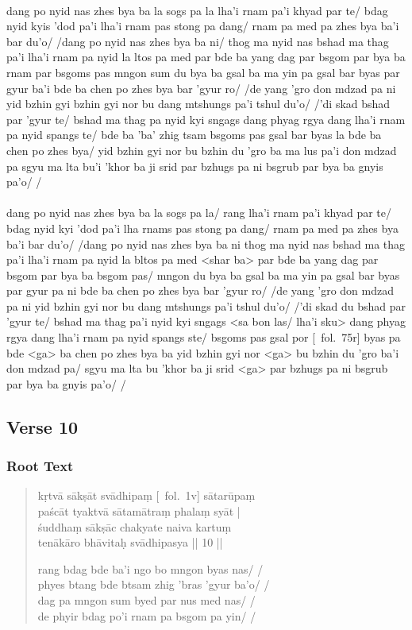 \documentclass[12pt]{article}
\begin{document}
\textbf{\TVA}\\
dang po nyid nas zhes bya ba la sogs pa la lha'i rnam pa'i khyad par te/ bdag nyid kyis 'dod pa'i lha'i rnam pas stong pa dang/ rnam pa med pa zhes bya ba'i bar du'o/ /dang po nyid nas zhes bya ba ni/ thog ma nyid nas bshad ma thag pa'i lha'i rnam pa nyid la ltos pa med par bde ba yang dag par bsgom par bya ba rnam par bsgoms pas mngon sum du bya ba gsal ba ma yin pa gsal bar byas par gyur ba'i bde ba chen po zhes bya bar 'gyur ro/ /de yang 'gro don mdzad pa ni yid bzhin gyi bzhin gyi nor bu dang mtshungs pa'i tshul du'o/ /'di skad bshad par 'gyur te/ bshad ma thag pa nyid kyi sngags dang phyag rgya dang lha'i rnam pa nyid spangs te/ bde ba 'ba' zhig tsam bsgoms pas gsal bar byas la bde ba chen po zhes bya/ yid bzhin gyi nor bu bzhin du 'gro ba ma lus pa'i don mdzad pa sgyu ma lta bu'i 'khor ba ji srid par bzhugs pa ni bsgrub par bya ba gnyis pa'o/ /\\

\textbf{\TVB}\\
dang po nyid nas zhes bya ba la sogs pa la/ rang lha'i rnam pa'i khyad par te/ bdag nyid kyi 'dod pa'i lha rnams pas stong pa dang/ rnam pa med pa zhes bya ba'i bar du'o/ /dang po nyid nas zhes bya ba ni thog ma nyid nas bshad ma thag pa'i lha'i rnam pa nyid la bltos pa med <shar ba> par bde ba yang dag par bsgom par bya ba bsgom pas/ mngon du bya ba gsal ba ma yin pa gsal bar byas par gyur pa ni bde ba chen po zhes bya bar 'gyur ro/ /de yang 'gro don mdzad pa ni yid bzhin gyi nor bu dang mtshungs pa'i tshul du'o/ /'di skad du bshad par 'gyur te/ bshad ma thag pa'i nyid kyi sngags <sa bon las/ lha'i sku> dang phyag rgya dang lha'i rnam pa nyid spangs ste/ bsgoms pas gsal por [\TVB\ fol.\ 75r] byas pa bde <ga> ba chen po zhes bya ba yid bzhin gyi nor <ga> bu bzhin du 'gro ba'i don mdzad pa/ sgyu ma lta bu 'khor ba ji srid <ga> par bzhugs pa ni bsgrub par bya ba gnyis pa'o/ /

\subsection{Verse 10}
\subsubsection{Root Text}
\begin{quote}
	kṛtvā sākṣāt svādhipaṃ [\MS\ fol.\ 1v] sātarūpaṃ \\
	paścāt tyaktvā sātamātraṃ phalaṃ syāt |\\
	śuddhaṃ sākṣāc chakyate naiva kartuṃ \\
	tenākāro bhāvitaḥ svādhipasya || 10 ||

	rang bdag bde ba'i ngo bo mngon byas nas/ /\\
	phyes btang bde btsam zhig 'bras 'gyur ba'o/ /\\
	dag pa mngon sum byed par nus med nas/ /\\
	de phyir bdag po'i rnam pa bsgom pa yin/ /
\end{quote}
\end{document}
